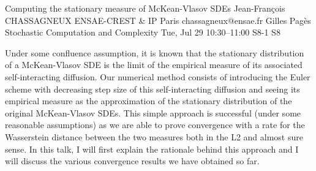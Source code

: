 \begin{talk}
  {Computing the stationary measure of McKean-Vlasov SDEs}%
  {Jean-Fran\c{c}ois CHASSAGNEUX}%
  {ENSAE-CREST \& IP Paris}%
  {chassagneux@ensae.fr}%
  {Gilles Pag\`es}%
  {Stochastic Computation and Complexity}%
  {Tue, Jul 29 10:30--11:00}%
  {S8-1}%
  {S8}%
    
   
Under some confluence assumption, it is known that the stationary distribution of a McKean-Vlasov SDE is the limit of the empirical measure of its associated self-interacting diffusion. 
Our numerical method consists of introducing the Euler scheme with decreasing step size of this self-interacting diffusion and seeing its empirical measure as the approximation of the stationary distribution of the original McKean-Vlasov SDEs.
This simple approach is successful (under some reasonable assumptions) as we are able to prove convergence with a rate for the Wasserstein distance between the two measures both in the L2 and almost sure sense. In this talk, I will first explain the rationale behind this approach and  I will discuss the various convergence results we have obtained so far.





\end{talk}


